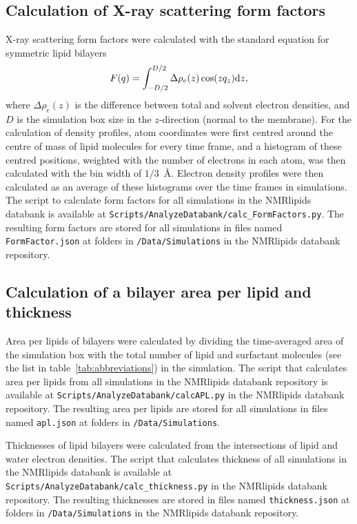 \documentclass[fleqn,10pt]{wlscirep}
\begin{document}
\subsection{Calculation of X-ray scattering form factors}
X-ray scattering form factors were calculated with the standard equation for symmetric lipid bilayers~\cite{ollila16}
\begin{equation}\label{FFsimpl}
F(q)=\int_{-D/2}^{D/2}\Delta \rho_e(z) \cos(zq_z) {\rm d}z,
\end{equation}
where $\Delta \rho_e(z)$ is the difference between total and solvent electron densities, and $D$ is the simulation box size in the $z$-direction (normal to the membrane). For the calculation of density profiles, atom coordinates were first centred around the centre of mass of lipid molecules for every time frame, and a histogram of these centred positions, weighted with the number of electrons in each atom, was then calculated with the bin width of $1/3$~\AA{}. Electron density profiles were then calculated as an average of these histograms over the time frames in simulations. The script to calculate form factors for all simulations in the NMRlipids databank is available at \texttt{Scripts/AnalyzeDatabank/calc\_FormFactors.py}. The resulting form factors are stored for all simulations in files named \texttt{FormFactor.json} at folders in \texttt{/Data/Simulations} in the NMRlipids databank repository.

\subsection{Calculation of a bilayer area per lipid and thickness}
Area per lipids of bilayers were calculated by dividing the time-averaged area of the simulation box with the total number of lipid and surfactant molecules (see the list in table~\ref{tab:abbreviations}) in the simulation. The script that calculates area per lipids from all simulations in the NMRlipids databank repository is available at \texttt{Scripts/AnalyzeDatabank/calcAPL.py} in the NMRlipids databank repository. The resulting area per lipids are stored for all simulations in files named \texttt{apl.json} at folders in \texttt{/Data/Simulations}. 

Thicknesses of lipid bilayers were calculated from the intersections of lipid and water electron densities. The script that calculates thickness of all simulations in the NMRlipids databank is available at \texttt{Scripts/AnalyzeDatabank/calc\_thickness.py} in the NMRlipids databank repository. The resulting thicknesses are stored in files named \texttt{thickness.json} at folders in \texttt{/Data/Simulations} in the NMRlipids databank repository. 
\end{document}
